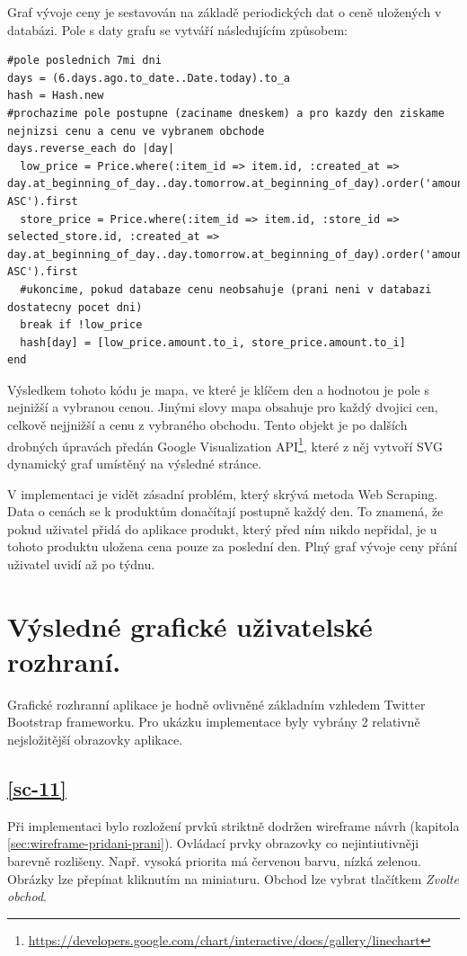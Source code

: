 Graf vývoje ceny je sestavován na základě periodických dat o ceně uložených v databázi. Pole s daty grafu se vytváří následujícím způsobem: 
\begin{lstlisting}
#pole poslednich 7mi dni
days = (6.days.ago.to_date..Date.today).to_a
hash = Hash.new
#prochazime pole postupne (zaciname dneskem) a pro kazdy den ziskame nejnizsi cenu a cenu ve vybranem obchode
days.reverse_each do |day|
  low_price = Price.where(:item_id => item.id, :created_at => day.at_beginning_of_day..day.tomorrow.at_beginning_of_day).order('amount ASC').first
  store_price = Price.where(:item_id => item.id, :store_id => selected_store.id, :created_at => day.at_beginning_of_day..day.tomorrow.at_beginning_of_day).order('amount ASC').first
  #ukoncime, pokud databaze cenu neobsahuje (prani neni v databazi dostatecny pocet dni)
  break if !low_price
  hash[day] = [low_price.amount.to_i, store_price.amount.to_i]
end
\end{lstlisting}

Výsledkem tohoto kódu je mapa, ve které je klíčem den a hodnotou je pole s nejnižší a vybranou cenou. Jinými slovy mapa obsahuje pro každý dvojici cen, celkově nejjnižší a cenu z vybraného obchodu. Tento objekt je po dalších drobných úpravách předán Google Visualization API\footnote{\url{https://developers.google.com/chart/interactive/docs/gallery/linechart}}, které z něj vytvoří SVG dynamický graf umístěný na výsledné stránce.

V implementaci je vidět zásadní problém, který skrývá metoda Web Scraping. Data o cenách se k produktům donačítají postupně každý den. To znamená, že pokud uživatel přidá do aplikace produkt, který před ním nikdo nepřidal, je u tohoto produktu uložena cena pouze za poslední den. Plný graf vývoje ceny přání uživatel uvidí až po týdnu.

\section{Výsledné grafické uživatelské rozhraní.}
Grafické rozhranní aplikace je hodně ovlivněné základním vzhledem Twitter Bootstrap frameworku. Pro ukázku implementace byly vybrány 2 relativně nejsložitější obrazovky aplikace.
\subsection{\ref{sc-11}}
Při implementaci bylo rozložení prvků striktně dodržen wireframe návrh (kapitola \ref{sec:wireframe-pridani-prani}). Ovládací prvky obrazovky co nejintiutivněji barevně rozlišeny. Např. vysoká priorita má červenou barvu, nízká zelenou. Obrázky lze přepínat kliknutím na miniaturu. Obchod lze vybrat tlačítkem \emph{Zvolte obchod}.

